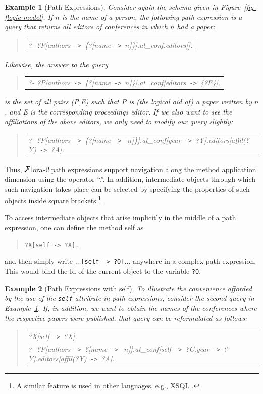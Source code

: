 \documentclass[11pt]{article}
\newtheorem{example}{Example}[section]
\newenvironment{qrules}{\begin{quote}\tt\begin{tabular}[t]{l}}%
{\end{tabular}\end{quote}}
\newcommand{\mvd}{{\mbox{\tt \,->\,}}}  %
\newcommand{\anon}{?}
\newcommand{\FLORA}{{\mbox{\sc ${\cal F}${lora}\rm\emph{-2}}}\xspace}
\begin{document}
\begin{example}[Path Expressions]\label{Ex:PathExpr}
  \rm Consider again the schema given in Figure~\ref{fig-flogic-model}.  If
  $n$ is the name of a person, the following path expression is a query
  that returns all editors of conferences in which $n$ had a paper:
  \begin{qrules}
   ?- ?P[authors\mvd\{\anon [name\mvd $n$]\}].at\_conf.editors[].
  \end{qrules}
  Likewise, the answer to the query
  \begin{qrules}
   ?- ?P[authors\mvd\{\anon [name\mvd $n$]\}].at\_conf[editors\mvd\{?E\}].
  \end{qrules}
  is the set of all pairs (\textsf{P},\textsf{E}) such that \textsf{P} is
  (the logical oid of) a paper written by $n$, and \textsf{E} is the
  corresponding proceedings editor.  If we also want to see the
  affiliations of the above editors, we only need to modify our query
  slightly:
  \begin{qrules}
   ?- ?P[authors\mvd\{\anon [name\mvd
    $n$]\}].at\_conf[year\mvd ?Y].editors[affil(?Y)\mvd ?A].
  \end{qrules}
\end{example}
Thus, \FLORA path expressions support navigation 
along the method application dimension using the operator
``.''.
In addition, intermediate objects through which such navigation
takes place can be selected by specifying the properties of such objects
inside square brackets.\footnote{
  A similar feature is used in other languages, e.g., XSQL \cite{xsql-92}.
  }

To access intermediate objects that arise implicitly in the middle
of a path expression, one can define the method \textsf{self} as
\begin{quote}
  {\tt ?X[self{\mvd}?X].} 
\end{quote}
and then simply write $\dots${\tt [self{\mvd}?O]}$\dots$ anywhere in a
complex path expression. This would bind the Id of the current object to
the variable {\tt ?O}.

\begin{example}[Path Expressions with \textsf{self}]\label{ex-path-self}
  \rm{
    To illustrate the convenience afforded by the use of the {\tt self}
    attribute in path expressions, consider the second query in
    Example~\ref{Ex:PathExpr}. If, in addition, we want to obtain the names
    of the conferences where the respective papers were published, that
    query can be reformulated as follows:
    }
  \begin{qrules}
    \hspace*{-12mm}
    ?X[self\mvd ?X].\\
    \hspace*{-12mm}
    ?- ?P[authors\mvd\anon[name\mvd
    $n$]].at\_conf[self\mvd ?C,year\mvd ?Y].editors[affil(?Y)\mvd ?A]. 
  \end{qrules}
\end{example}
\end{document}
